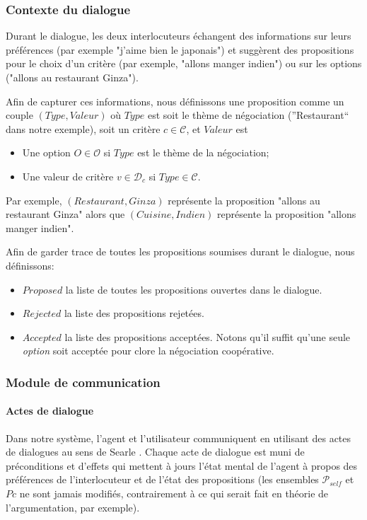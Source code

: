 \documentclass [french]{sig-alternate-05-2015}
\begin{document}
\subsubsection{Contexte du dialogue}
\par Durant le dialogue, les deux interlocuteurs échangent des informations sur leurs préférences (par exemple "j'aime bien le japonais") et suggèrent des propositions pour le choix d'un critère (par exemple, "allons manger indien") ou sur les options ("allons au restaurant Ginza").

Afin de capturer ces informations, nous définissons une proposition comme un couple $(Type, Valeur)$ où $Type$ est soit le thème de négociation (''Restaurant`` dans notre exemple), soit un critère $c \in \mathcal{C}$, et $Valeur$ est
\begin{itemize}
		\item Une option $O \in \mathcal{O}$ si $Type$ est le thème de la négociation; 
		\item Une valeur de critère $v \in \mathcal{D}_c$ si $Type \in \mathcal{C}$.
\end{itemize}
Par exemple, $(Restaurant,Ginza)$ représente la proposition "allons au restaurant Ginza" alors que $(Cuisine,Indien)$ représente la proposition "allons manger indien".

Afin de garder trace de toutes les propositions soumises durant le dialogue, nous définissons:
\begin{itemize}
	\item $ Proposed$ la liste de toutes les propositions ouvertes dans le dialogue.
	\item $ Rejected$ la liste des propositions rejetées.
	\item $ Accepted$ la liste des propositions acceptées. Notons qu'il suffit qu'une seule \emph{option} soit acceptée pour clore la négociation coopérative.
\end{itemize}

\subsubsection{Module de communication}

\paragraph{Actes de dialogue}
\par Dans notre système, l'agent et l'utilisateur communiquent en utilisant des actes de dialogues au sens de Searle \cite{searle1969speech}. Chaque acte de dialogue est muni de préconditions et d'effets qui mettent à jours l'état mental de l'agent à propos des préférences de l'interlocuteur et de l'état des propositions (les ensembles $\mathcal{P}_{self}$ et $Pc$ ne sont jamais modifiés, contrairement à ce qui serait fait en théorie de l'argumentation, par exemple). 
\end{document}
